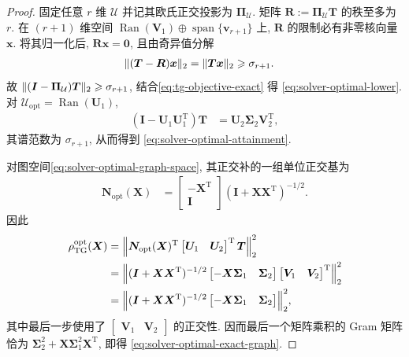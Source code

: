\documentclass{ctexart}
\newcommand{\T}{\mathrm{T}}
\renewcommand{\ge}{\geqslant}
\DeclareMathOperator{\Ran}{Ran}
\DeclarePairedDelimiter\norm{\lVert}{\rVert}
\begin{document}
\begin{proof}
固定任意 $r$ 维 $\mathcal U$ 并记其欧氏正交投影为
$\bm\Pi_{\mathcal U}$. 矩阵
$\bm R:=\bm\Pi_{\mathcal U}\bm T$ 的秩至多为 $r$.
在 $(r+1)$ 维空间 $\Ran(\bm V_1)\oplus\operatorname{span}\{\bm v_{r+1}\}$
上, $\bm R$ 的限制必有非零核向量 $\bm x$. 将其归一化后,
$\bm R\bm x=\mathbf0$, 且由奇异值分解
\begin{align}
    \norm{(\bm T-\bm R)\bm x}_2
    &=\norm{\bm T\bm x}_2
      \ge\sigma_{r+1}.
    \label{eq:solver-optimal-rank-proof}
\end{align}
故
$\norm{(\bm I-\bm\Pi_{\mathcal U})\bm T}_2\ge\sigma_{r+1}$,
结合\cref{eq:tg-objective-exact} 得
\cref{eq:solver-optimal-lower}. 对
$\mathcal U_{\mathrm{opt}}=\Ran(\bm U_1)$,
\begin{align}
    (\bm I-\bm U_1\bm U_1^\T)\bm T
    &=
    \bm U_2\bm\Sigma_2\bm V_2^\T,
    \label{eq:solver-optimal-residual}
\end{align}
其谱范数为 $\sigma_{r+1}$, 从而得到
\cref{eq:solver-optimal-attainment}.

对图空间\cref{eq:solver-optimal-graph-space}, 其正交补的一组单位正交基为
\begin{align}
    \bm N_{\mathrm{opt}}(\bm X)
    &=
    \begin{bmatrix}
      -\bm X^\T\\
      \bm I
    \end{bmatrix}
    (\bm I+\bm X\bm X^\T)^{-1/2}.
    \label{eq:solver-optimal-complement}
\end{align}
因此
\begin{align}
    \rho_{\mathrm{TG}}^{\mathrm{opt}}(\bm X)
    &=
    \norm*{
      \bm N_{\mathrm{opt}}(\bm X)^\T
      \begin{bmatrix}\bm U_1&\bm U_2\end{bmatrix}^{\T}
      \bm T
    }_2^2\notag\\
    &=
    \norm*{
      (\bm I+\bm X\bm X^\T)^{-1/2}
      \begin{bmatrix}
        -\bm X\bm\Sigma_1&\bm\Sigma_2
      \end{bmatrix}
      \begin{bmatrix}\bm V_1&\bm V_2\end{bmatrix}^{\T}
    }_2^2\notag\\
    &=
    \norm*{
      (\bm I+\bm X\bm X^\T)^{-1/2}
      \begin{bmatrix}
        -\bm X\bm\Sigma_1&\bm\Sigma_2
      \end{bmatrix}
    }_2^2,
    \label{eq:solver-optimal-graph-proof}
\end{align}
其中最后一步使用了 $\begin{bmatrix}\bm V_1&\bm V_2\end{bmatrix}$ 的正交性. 因而最后一个矩阵乘积的 Gram 矩阵恰为
$\bm\Sigma_2^2+\bm X\bm\Sigma_1^2\bm X^\T$, 即得
\cref{eq:solver-optimal-exact-graph}.
\end{proof}
\end{document}
